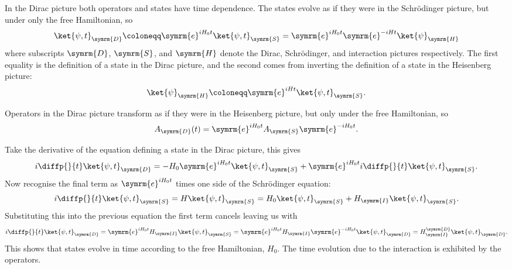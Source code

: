 \documentclass[fleqn]{NotesClass}
\newcommand{\e}{\symrm{e}}
\newcommand{\interaction}{\symrm{I}}
\begin{document}
    In the Dirac picture both operators and states have time dependence.
    The states evolve as if they were in the Schrödinger picture, but under only the free Hamiltonian, so
    \begin{equation}
        \ket{\psi, t}_{\symrm{D}} \coloneqq \e^{iH_0t} \ket{\psi, t}_{\symrm{S}} = \e^{iH_0t} \e^{-iHt}\ket{\psi}_{\symrm{H}}
    \end{equation}
    where subscripts \(\symrm{D}\), \(\symrm{S}\), and \(\symrm{H}\) denote the Dirac, Schrödinger, and interaction pictures respectively.
    The first equality is the definition of a state in the Dirac picture, and the second comes from inverting the definition of a state in the Heisenberg picture:
    \begin{equation}
        \ket{\psi}_{\symrm{H}} \coloneqq \e^{iHt}\ket{\psi, t}_{\symrm{S}}.
    \end{equation}
    
    Operators in the Dirac picture transform as if they were in the Heisenberg picture, but only under the free Hamiltonian, so
    \begin{equation}
        A_{\symrm{D}}(t) = \e^{iH_0t} A_{\symrm{S}} \e^{-iH_0t}.
    \end{equation}
    
    Take the derivative of the equation defining a state in the Dirac picture, this gives
    \begin{equation}
        i\diffp{}{t} \ket{\psi, t}_{\symrm{D}} = -H_0\e^{iH_0t}\ket{\psi, t}_{\symrm{S}} + \e^{iH_0t} i\diffp{}{t}\ket{\psi, t}_{\symrm{S}}.
    \end{equation}
    Now recognise the final term as \(\e^{iH_0t}\) times one side of the Schrödinger equation:
    \begin{equation}
        i\diffp{}{t} \ket{\psi, t}_{\symrm{S}} = H\ket{\psi, t}_{\symrm{S}} = H_0 \ket{\psi, t}_{\symrm{S}} + H_{\interaction} \ket{\psi, t}_{\symrm{S}}.
    \end{equation}
    Substituting this into the previous equation the first term cancels leaving us with
    \begin{equation}
        i\diffp{}{t} \ket{\psi, t}_{\symrm{D}} = \e^{iH_0t} H_{\interaction} \ket{\psi, t}_{\symrm{S}} = \e^{iH_0t} H_{\interaction} \e^{-iH_0t}\ket{\psi, t}_{\symrm{D}} = H_{\interaction}^{\symrm{D}}\ket{\psi, t}_{\symrm{D}}.
    \end{equation}
    This shows that states evolve in time according to the free Hamiltonian, \(H_0\).
    The time evolution due to the interaction is exhibited by the operators.
    
\end{document}
